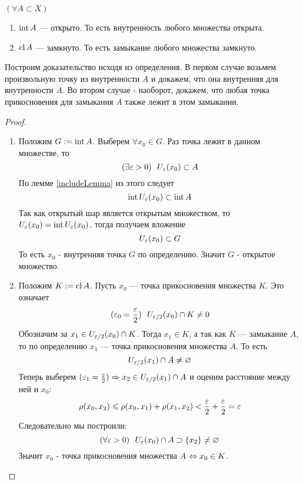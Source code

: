 \begin{theorem}
	$(\forall A \subset X)$
	\begin{enumerate}
		\item $\operatorname{int} A$ --- открыто. То есть
			внутренность любого множества открыта.
		\item $\operatorname{cl} A$ --- замкнуто. То есть
			замыкание любого множества замкнуто.
	\end{enumerate}
\end{theorem}

\begin{idea}
	Построим доказательство исходя из определения. В первом
	случае возьмем произвольную точку из внутренности $A$ и докажем, что
	она внутренняя для внутренности $A$. Во втором случае - наоборот,
	докажем, что любая точка прикосновения для замыкания $A$
	также лежит в этом замыкании.
\end{idea}

\begin{proof}~
	\begin{enumerate}
		\item Положим $G := \operatorname{int} A$. Выберем $\forall x_0
			\in G$. Раз точка лежит в данном множестве, то
			\[
				(\exists \eps > 0)\ \ U_\eps(x_0) \subset A
			\]
			По лемме \ref{includeLemma} из этого следует
			\[
				\operatorname{int} U_\varepsilon(x_0) \subset \operatorname{int} A
			\]
			Так как открытый шар является открытым
			множеством, то $U_\varepsilon(x_0) = \operatorname{int} U_\varepsilon(x_0)$,
			тогда получаем вложение
			\[
				U_\varepsilon(x_0) \subset G
			\]
			То есть $x_0$ - внутренняя точка $G$ по определению.
			Значит $G$ - открытое множество.
	
		\item Положим $K := \operatorname{cl} A$. Пусть $x_0$ --- точка
			прикосновения множества $K$. Это означает
			\[
				(\eps_0 = \frac{\eps}{2})\ \ 
				U_{\eps / 2}(x_0) \cap K \neq 0
			\]
			Обозначим за $x_1 \in U_{\varepsilon / 2}(x_0) \cap K$. Тогда
			$x_1 \in K$, а так как $K$ --- замыкание $A$, то по
			определению $x_1$ --- точка прикосновения множества $A$.
			То есть
			\[
				U_{\varepsilon / 2}(x_1) \cap A \neq \varnothing
			\]
			Теперь выберем $(\varepsilon_1 = \frac{\varepsilon}{2}) \Rightarrow
			x_2 \in U_{\varepsilon / 2}(x_1) \cap A$ и
			оценим расстояние между ней и $x_0$:
			\[
				\rho(x_0, x_2) \leqslant \rho(x_0, x_1) +
				\rho(x_1, x_2) < \frac{\varepsilon}{2} + \frac{\varepsilon}{2}
				= \varepsilon
			\]
			Следовательно мы построили:
			\[
				(\forall \varepsilon > 0)\ \ U_{\varepsilon}(x_0) \cap A \supset
				\{x_2\} \neq \varnothing
			\]
			Значит $x_0$ - точка прикосновения множества $A$ $\Leftrightarrow x_0 \in K$.
	\end{enumerate}
\end{proof}

